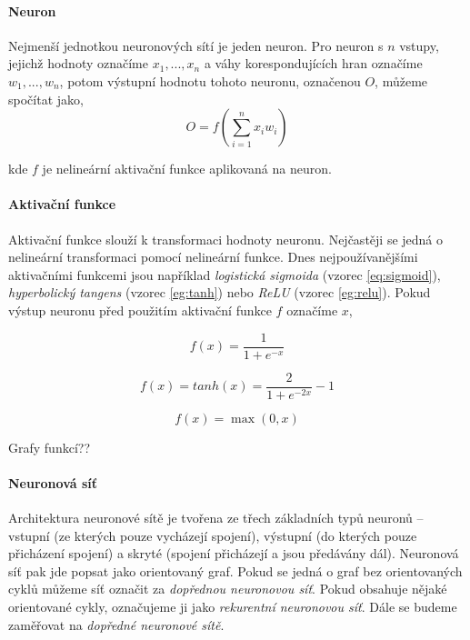\paragraph{Neuron}
Nejmenší jednotkou neuronových sítí je jeden neuron. Pro neuron s $n$ vstupy,
jejichž hodnoty označíme $x_1,...,x_n$ a váhy korespondujících hran označíme\\
$w_1,...,w_n$, potom výstupní hodnotu tohoto neuronu, označenou $O$,
můžeme spočítat jako,
\begin{equation}
    O = f(\sum_{i=1}^{n} x_iw_i)
\end{equation}

kde $f$ je nelineární aktivační funkce aplikovaná na neuron.

\paragraph{Aktivační funkce}
Aktivační funkce slouží k transformaci hodnoty neuronu. Nejčastěji se jedná o
nelineární transformaci pomocí nelineární funkce. Dnes nejpoužívanějšími
aktivačními funkcemi jsou například \emph{logistická sigmoida} (vzorec
\ref{eq:sigmoid}), \emph{hyperbolický tangens} (vzorec \ref{eg:tanh}) nebo
\emph{ReLU} (vzorec \ref{eg:relu}). Pokud výstup neuronu před použitím
aktivační funkce $f$ označíme $x$,


\begin{equation} \label{eq:sigmoid}
    f(x) = \frac{1}{1+e^{-x}}
\end{equation}

\begin{equation} \label{eg:tanh}
    f(x) = tanh(x) = \frac{2}{1+e^{-2x}} - 1
\end{equation}

\begin{equation} \label{eg:relu}
    f(x) = \max(0, x)
\end{equation}

Grafy funkcí??

\paragraph{Neuronová síť}
Architektura neuronové sítě je tvořena ze třech základních typů neuronů --
vstupní (ze kterých pouze vycházejí spojení), výstupní (do kterých pouze
přicházení spojení) a skryté (spojení přicházejí a jsou předávány dál).
Neuronová síť pak jde popsat jako orientovaný graf. Pokud se jedná o graf bez
orientovaných cyklů můžeme síť označit za \emph{dopřednou neuronovou síť}.
Pokud obsahuje nějaké orientované cykly, označujeme ji jako \emph{rekurentní
neuronovou síť}. Dále se budeme zaměřovat na \emph{dopředné neuronové sítě}.

